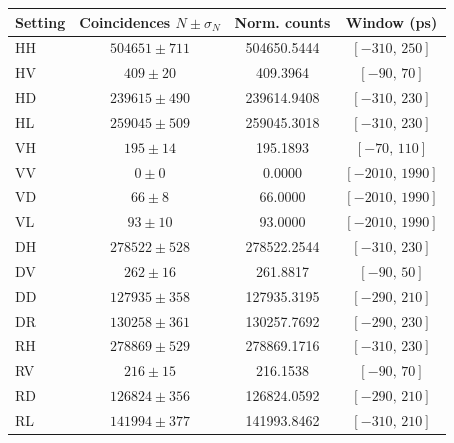 \begin{tabular}{lccc}
\hline
Setting & Coincidences $N\pm\sigma_N$ & Norm. counts & Window (ps) \\
\hline
HH & $504651\pm711$ & 504650.5444 & $[-310,\,250]$ \\
HV & $409\pm20$ & 409.3964 & $[-90,\,70]$ \\
HD & $239615\pm490$ & 239614.9408 & $[-310,\,230]$ \\
HL & $259045\pm509$ & 259045.3018 & $[-310,\,230]$ \\
VH & $195\pm14$ & 195.1893 & $[-70,\,110]$ \\
VV & $0\pm0$ & 0.0000 & $[-2010,\,1990]$ \\
VD & $66\pm8$ & 66.0000 & $[-2010,\,1990]$ \\
VL & $93\pm10$ & 93.0000 & $[-2010,\,1990]$ \\
DH & $278522\pm528$ & 278522.2544 & $[-310,\,230]$ \\
DV & $262\pm16$ & 261.8817 & $[-90,\,50]$ \\
DD & $127935\pm358$ & 127935.3195 & $[-290,\,210]$ \\
DR & $130258\pm361$ & 130257.7692 & $[-290,\,230]$ \\
RH & $278869\pm529$ & 278869.1716 & $[-310,\,230]$ \\
RV & $216\pm15$ & 216.1538 & $[-90,\,70]$ \\
RD & $126824\pm356$ & 126824.0592 & $[-290,\,210]$ \\
RL & $141994\pm377$ & 141993.8462 & $[-310,\,210]$ \\
\hline
\end{tabular}